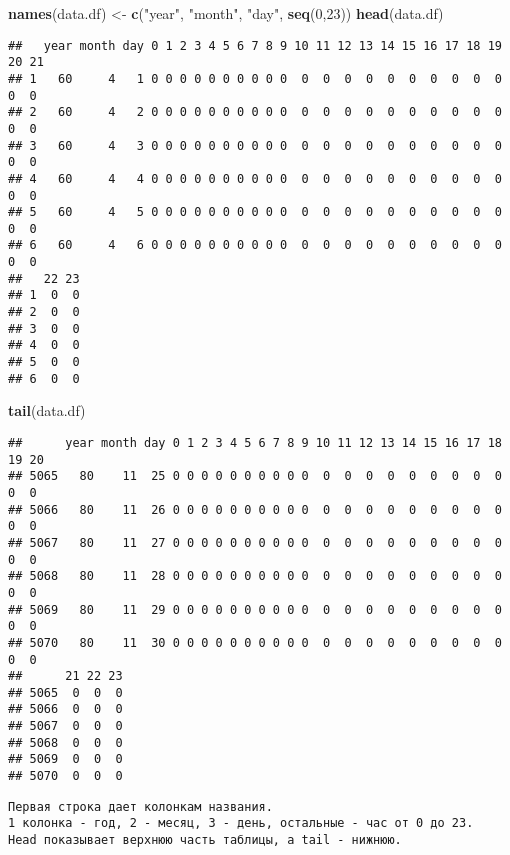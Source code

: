 \documentclass[]{article}
\newenvironment{Shaded}{\begin{snugshade}}{\end{snugshade}}
\newcommand{\KeywordTok}[1]{\textcolor[rgb]{0.13,0.29,0.53}{\textbf{#1}}}
\newcommand{\DecValTok}[1]{\textcolor[rgb]{0.00,0.00,0.81}{#1}}
\newcommand{\StringTok}[1]{\textcolor[rgb]{0.31,0.60,0.02}{#1}}
\newcommand{\NormalTok}[1]{#1}
\begin{document}
\begin{Shaded}
\begin{Highlighting}[]
\KeywordTok{names}\NormalTok{(data.df) <-}\StringTok{ }\KeywordTok{c}\NormalTok{(}\StringTok{"year"}\NormalTok{, }\StringTok{"month"}\NormalTok{, }\StringTok{"day"}\NormalTok{, }\KeywordTok{seq}\NormalTok{(}\DecValTok{0}\NormalTok{,}\DecValTok{23}\NormalTok{))}
\KeywordTok{head}\NormalTok{(data.df)}
\end{Highlighting}
\end{Shaded}

\begin{verbatim}
##   year month day 0 1 2 3 4 5 6 7 8 9 10 11 12 13 14 15 16 17 18 19 20 21
## 1   60     4   1 0 0 0 0 0 0 0 0 0 0  0  0  0  0  0  0  0  0  0  0  0  0
## 2   60     4   2 0 0 0 0 0 0 0 0 0 0  0  0  0  0  0  0  0  0  0  0  0  0
## 3   60     4   3 0 0 0 0 0 0 0 0 0 0  0  0  0  0  0  0  0  0  0  0  0  0
## 4   60     4   4 0 0 0 0 0 0 0 0 0 0  0  0  0  0  0  0  0  0  0  0  0  0
## 5   60     4   5 0 0 0 0 0 0 0 0 0 0  0  0  0  0  0  0  0  0  0  0  0  0
## 6   60     4   6 0 0 0 0 0 0 0 0 0 0  0  0  0  0  0  0  0  0  0  0  0  0
##   22 23
## 1  0  0
## 2  0  0
## 3  0  0
## 4  0  0
## 5  0  0
## 6  0  0
\end{verbatim}

\begin{Shaded}
\begin{Highlighting}[]
\KeywordTok{tail}\NormalTok{(data.df)}
\end{Highlighting}
\end{Shaded}

\begin{verbatim}
##      year month day 0 1 2 3 4 5 6 7 8 9 10 11 12 13 14 15 16 17 18 19 20
## 5065   80    11  25 0 0 0 0 0 0 0 0 0 0  0  0  0  0  0  0  0  0  0  0  0
## 5066   80    11  26 0 0 0 0 0 0 0 0 0 0  0  0  0  0  0  0  0  0  0  0  0
## 5067   80    11  27 0 0 0 0 0 0 0 0 0 0  0  0  0  0  0  0  0  0  0  0  0
## 5068   80    11  28 0 0 0 0 0 0 0 0 0 0  0  0  0  0  0  0  0  0  0  0  0
## 5069   80    11  29 0 0 0 0 0 0 0 0 0 0  0  0  0  0  0  0  0  0  0  0  0
## 5070   80    11  30 0 0 0 0 0 0 0 0 0 0  0  0  0  0  0  0  0  0  0  0  0
##      21 22 23
## 5065  0  0  0
## 5066  0  0  0
## 5067  0  0  0
## 5068  0  0  0
## 5069  0  0  0
## 5070  0  0  0
\end{verbatim}

\begin{verbatim}
Первая строка дает колонкам названия. 
1 колонка - год, 2 - месяц, 3 - день, остальные - час от 0 до 23. 
Head показывает верхнюю часть таблицы, а tail - нижнюю. 
\end{verbatim}
\end{document}
